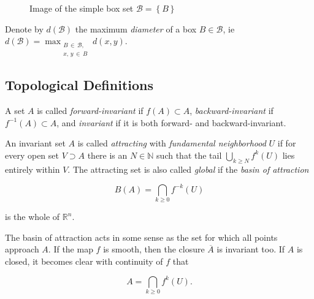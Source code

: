 \begin{figure}[ht]
    \caption{Image of the simple box set $\mathcal{B} = \left\{ B \right\}$}
    \label{fig:boximage}
\end{figure}

\begin{definition}
    Denote by $d(\mathcal{B})$ the maximum \emph{diameter} of a box $B \in \mathcal{B}$, ie 
    $d(\mathcal{B}) = \max_{\substack{B\, \in\, \mathcal{B},\\ x,\, y\, \in\, B}} d(x, y)$. 
\end{definition}


\subsection{Topological Definitions}

\begin{definition}
    \cite*{algGAIO} A set $A$ is called \emph{forward-invariant} if $f(A) \subset A$, 
    \emph{backward-invariant} if $f^{-1}(A) \subset A$, and \emph{invariant} if it is
    both forward- and backward-invariant.
\end{definition}

\begin{definition}
    \cite*{subalg} An invariant set $A$ is called \emph{attracting} with \emph{fundamental neighborhood}
    $U$ if for every open set $V \supset A$ there is an $N \in \mathbb{N}$ such that the tail 
    $\bigcup_{k \geq N} f^k(U)$ lies entirely within $V$. The attracting 
    set is also called \emph{global} if the \emph{basin of attraction} 
    
    \begin{equation}\label{eq:globattr}
        B(A) = \bigcap\limits_{k \geq 0} f^{-k}(U)
    \end{equation}

    is the whole of $\mathbb{R}^n$.
\end{definition}

The basin of attraction acts in some sense as the set for which all points approach
$A$. If the map $f$ is smooth, then the closure $\overline{A}$ is invariant too. 
If $A$ is closed, it becomes clear with continuity of $f$ that 

\begin{equation}
    A = \bigcap\limits_{k \geq 0} f^k(U).
\end{equation}


